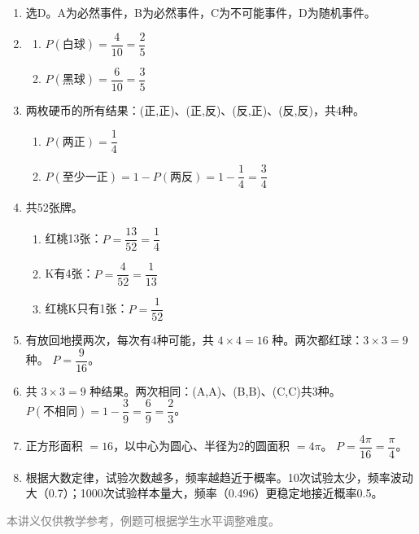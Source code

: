 \documentclass[12pt, a4paper]{ctexart}
\begin{document}
\vspace{10pt}
\begin{knowledgebox}[参考答案]
\begin{enumerate}[label=\textbf{\arabic*.}, leftmargin=2em]
  \item 选D。A为必然事件，B为必然事件，C为不可能事件，D为随机事件。

  \item
  \begin{enumerate}[label=(\arabic*)]
    \item $P(\text{白球}) = \dfrac{4}{10} = \dfrac{2}{5}$
    \item $P(\text{黑球}) = \dfrac{6}{10} = \dfrac{3}{5}$
  \end{enumerate}

  \item 两枚硬币的所有结果：(正,正)、(正,反)、(反,正)、(反,反)，共4种。
  \begin{enumerate}[label=(\arabic*)]
    \item $P(\text{两正}) = \dfrac{1}{4}$
    \item $P(\text{至少一正}) = 1 - P(\text{两反}) = 1 - \dfrac{1}{4} = \dfrac{3}{4}$
  \end{enumerate}

  \item 共52张牌。
  \begin{enumerate}[label=(\arabic*)]
    \item 红桃13张：$P = \dfrac{13}{52} = \dfrac{1}{4}$
    \item K有4张：$P = \dfrac{4}{52} = \dfrac{1}{13}$
    \item 红桃K只有1张：$P = \dfrac{1}{52}$
  \end{enumerate}

  \item 有放回地摸两次，每次有4种可能，共 $4 \times 4 = 16$ 种。两次都红球：$3 \times 3 = 9$ 种。
  $P = \dfrac{9}{16}$。

  \item 共 $3 \times 3 = 9$ 种结果。两次相同：(A,A)、(B,B)、(C,C)共3种。
  $P(\text{不相同}) = 1 - \dfrac{3}{9} = \dfrac{6}{9} = \dfrac{2}{3}$。

  \item 正方形面积 $= 16$，以中心为圆心、半径为2的圆面积 $= 4\pi$。
  $P = \dfrac{4\pi}{16} = \dfrac{\pi}{4}$。

  \item 根据大数定律，试验次数越多，频率越趋近于概率。10次试验太少，频率波动大（0.7）；1000次试验样本量大，频率（0.496）更稳定地接近概率0.5。
\end{enumerate}
\end{knowledgebox}

\vfill
\begin{center}
\small\textcolor{gray}{本讲义仅供教学参考，例题可根据学生水平调整难度。}
\end{center}
\end{document}
